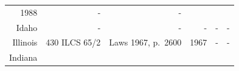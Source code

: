 \documentclass[]{article}
\begin{document}
\begin{longtable}[c]{@{}rrrrrr@{}}
\begin{minipage}[t]{0.10\columnwidth}
1988
\strut\end{minipage} &
\begin{minipage}[t]{0.10\columnwidth}\raggedleft\strut
-
\strut\end{minipage} &
\begin{minipage}[t]{0.10\columnwidth}\raggedleft\strut
-
\strut\end{minipage}\tabularnewline
\begin{minipage}[t]{0.10\columnwidth}\raggedleft\strut
Idaho
\strut\end{minipage} &
\begin{minipage}[t]{0.21\columnwidth}\raggedleft\strut
-
\strut\end{minipage} &
\begin{minipage}[t]{0.22\columnwidth}\raggedleft\strut
-
\strut\end{minipage} &
\begin{minipage}[t]{0.10\columnwidth}\raggedleft\strut
-
\strut\end{minipage} &
\begin{minipage}[t]{0.10\columnwidth}\raggedleft\strut
-
\strut\end{minipage} &
\begin{minipage}[t]{0.10\columnwidth}\raggedleft\strut
-
\strut\end{minipage}\tabularnewline
\begin{minipage}[t]{0.10\columnwidth}\raggedleft\strut
Illinois
\strut\end{minipage} &
\begin{minipage}[t]{0.21\columnwidth}\raggedleft\strut
430 ILCS 65/2
\strut\end{minipage} &
\begin{minipage}[t]{0.22\columnwidth}\raggedleft\strut
Laws 1967, p.~2600
\strut\end{minipage} &
\begin{minipage}[t]{0.10\columnwidth}\raggedleft\strut
1967
\strut\end{minipage} &
\begin{minipage}[t]{0.10\columnwidth}\raggedleft\strut
-
\strut\end{minipage} &
\begin{minipage}[t]{0.10\columnwidth}\raggedleft\strut
-
\strut\end{minipage}\tabularnewline
\begin{minipage}[t]{0.10\columnwidth}\raggedleft\strut
Indiana
\strut\end{minipage} &
\begin{minipage}[t]{0.21\columnwidth}\raggedleft\strut

\end{minipage}
\end{longtable}
\end{document}

